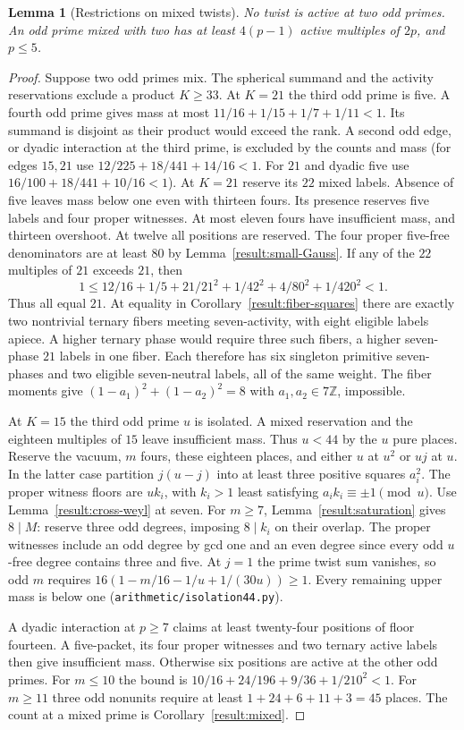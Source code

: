 \documentclass[11pt]{amsart}
\numberwithin{equation}{section}
\newtheorem{lemma}[theorem]{Lemma}
\theoremstyle{definition}
\theoremstyle{plain}
\newcommand{\ZZ}{\mathbb Z}
\begin{document}
\begin{lemma}[Restrictions on mixed twists]
No twist is active at two odd primes. An odd prime mixed with two
has at least $4(p-1)$ active multiples of $2p$, and $p\le5$.
\end{lemma}
\begin{proof}
Suppose two odd primes mix. The spherical summand and the activity
reservations exclude a product $K\ge33$. At $K=21$ the third odd
prime is five. A fourth odd prime gives mass at most
$11/16+1/15+1/7+1/11<1$. Its summand is disjoint as their product
would exceed the rank. A second odd edge, or dyadic interaction at
the third prime, is excluded by the counts and mass (for edges $15,21$
use $12/225+18/441+14/16<1$. For $21$ and dyadic five use
$16/100+18/441+10/16<1$). At $K=21$ reserve its $22$ mixed labels.
Absence of five leaves mass below one even with thirteen fours.
Its presence reserves five labels and four proper witnesses. At
most eleven fours have insufficient mass, and thirteen overshoot.
At twelve all positions are reserved. The four proper five-free
denominators are at least $80$ by Lemma~\ref{result:small-Gauss}.
If any of the $22$ multiples of $21$ exceeds $21$, then
\[
 1\le12/16+1/5+21/21^2+1/42^2+4/80^2+1/420^2<1.
\]
Thus all equal $21$. At equality in Corollary~\ref{result:fiber-squares}
there are exactly two nontrivial ternary fibers meeting seven-activity,
with eight eligible labels apiece. A higher ternary phase would require
three such fibers, a higher seven-phase $21$ labels in one fiber.
Each therefore has six singleton primitive seven-phases and two eligible
seven-neutral labels, all of the same weight. The fiber moments give
$(1-a_1)^2+(1-a_2)^2=8$ with $a_1,a_2\in7\ZZ$, impossible.

At $K=15$ the third odd prime $u$ is isolated. A mixed reservation
and the eighteen multiples of $15$ leave insufficient mass. Thus
$u<44$ by the $u$ pure places. Reserve the vacuum, $m$ fours, these
eighteen places, and either $u$ at $u^2$ or $uj$ at $u$. In the latter
case partition $j(u-j)$ into at least three positive squares $a_i^2$.
The proper witness floors are $uk_i$, with $k_i>1$ least satisfying
$a_ik_i\equiv\pm1\pmod u$. Use Lemma~\ref{result:cross-weyl} at seven.
For $m\ge7$, Lemma~\ref{result:saturation} gives $8\mid M$: reserve three
odd degrees, imposing $8\mid k_i$ on their overlap. The proper
witnesses include an odd degree by gcd one and an even degree since
every odd $u$-free degree contains three and five.
At $j=1$ the prime twist sum vanishes, so odd $m$ requires
$16(1-m/16-1/u+1/(30u))\ge1$. Every remaining upper mass is below one
(\texttt{arithmetic/isolation44.py}).

A dyadic interaction at $p\ge7$ claims at least twenty-four positions
of floor fourteen. A five-packet, its four proper witnesses and two
ternary active labels then give insufficient mass. Otherwise six
positions are active at the other odd primes. For $m\le10$ the bound
is $10/16+24/196+9/36+1/210^2<1$. For $m\ge11$ three odd nonunits
require at least $1+24+6+11+3=45$ places. The count at a mixed prime
is Corollary~\ref{result:mixed}.
\end{proof}
\end{document}
